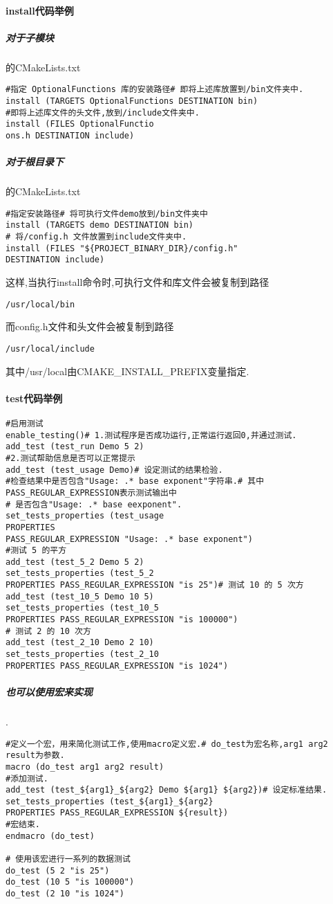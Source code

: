 \documentclass{ctexart}
\begin{document}
\paragraph{install代码举例}
\subparagraph{对于子模块}的CMakeLists.txt
\begin{verbatim}
#指定 OptionalFunctions 库的安装路径# 即将上述库放置到/bin文件夹中.
install (TARGETS OptionalFunctions DESTINATION bin)
#即将上述库文件的头文件,放到/include文件夹中.
install (FILES OptionalFunctio
ons.h DESTINATION include)
\end{verbatim}
\subparagraph{对于根目录下}的CMakeLists.txt
\begin{verbatim}
#指定安装路径# 将可执行文件demo放到/bin文件夹中
install (TARGETS demo DESTINATION bin)
# 将/config.h 文件放置到include文件夹中.
install (FILES "${PROJECT_BINARY_DIR}/config.h" 
DESTINATION include)
\end{verbatim}
这样,当执行install命令时,可执行文件和库文件会被复制到路径
\begin{verbatim}
/usr/local/bin
\end{verbatim}
而config.h文件和头文件会被复制到路径
\begin{verbatim}
/usr/local/include
\end{verbatim}
其中/usr/local由CMAKE\_INSTALL\_PREFIX变量指定.
\paragraph{test代码举例}
\begin{verbatim}
#启用测试
enable_testing()# 1.测试程序是否成功运行,正常运行返回0,并通过测试.
add_test (test_run Demo 5 2)
#2.测试帮助信息是否可以正常提示
add_test (test_usage Demo)# 设定测试的结果检验.
#检查结果中是否包含"Usage: .* base exponent"字符串.# 其中PASS_REGULAR_EXPRESSION表示测试输出中
# 是否包含"Usage: .* base eexponent".
set_tests_properties (test_usage
PROPERTIES 
PASS_REGULAR_EXPRESSION "Usage: .* base exponent")
#测试 5 的平方
add_test (test_5_2 Demo 5 2)
set_tests_properties (test_5_2
PROPERTIES PASS_REGULAR_EXPRESSION "is 25")# 测试 10 的 5 次方
add_test (test_10_5 Demo 10 5)
set_tests_properties (test_10_5
PROPERTIES PASS_REGULAR_EXPRESSION "is 100000")
# 测试 2 的 10 次方
add_test (test_2_10 Demo 2 10)
set_tests_properties (test_2_10
PROPERTIES PASS_REGULAR_EXPRESSION "is 1024")
\end{verbatim}
\subparagraph{也可以使用宏来实现}.
\begin{verbatim}
#定义一个宏，用来简化测试工作,使用macro定义宏.# do_test为宏名称,arg1 arg2 result为参数.
macro (do_test arg1 arg2 result) 
#添加测试.
add_test (test_${arg1}_${arg2} Demo ${arg1} ${arg2})# 设定标准结果.
set_tests_properties (test_${arg1}_${arg2}
PROPERTIES PASS_REGULAR_EXPRESSION ${result})
#宏结束.
endmacro (do_test) 

# 使用该宏进行一系列的数据测试
do_test (5 2 "is 25")
do_test (10 5 "is 100000")
do_test (2 10 "is 1024") 
\end{verbatim}
\end{document}
